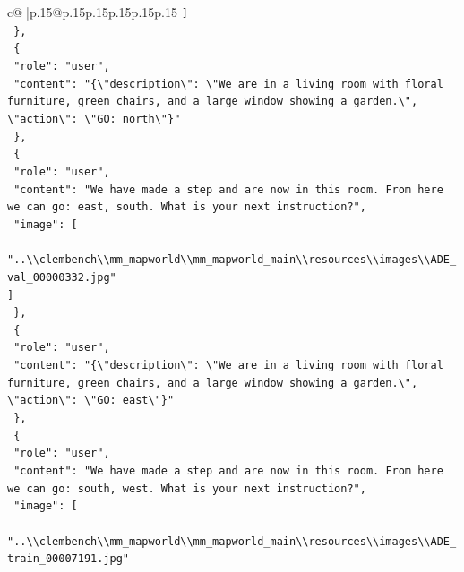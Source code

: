 \documentclass{article}
\begin{document}
{\begin{supertabular}{c@{$\;$}|p{.15\linewidth}@{}p{.15\linewidth}p{.15\linewidth}p{.15\linewidth}p{.15\linewidth}p{.15\linewidth}}
{{{\texttt{    {]}} \\
\texttt{  \},} \\
\texttt{  \{} \\
\texttt{    "role": "user",} \\
\texttt{    "content": "\{\textbackslash{}"description\textbackslash{}": \textbackslash{}"We are in a living room with floral furniture, green chairs, and a large window showing a garden.\textbackslash{}", \textbackslash{}"action\textbackslash{}": \textbackslash{}"GO: north\textbackslash{}"\}"} \\
\texttt{  \},} \\
\texttt{  \{} \\
\texttt{    "role": "user",} \\
\texttt{    "content": "We have made a step and are now in this room. From here we can go: east, south. What is your next instruction?",} \\
\texttt{    "image": {[}} \\
\texttt{      "..\textbackslash{}\textbackslash{}clembench\textbackslash{}\textbackslash{}mm\_mapworld\textbackslash{}\textbackslash{}mm\_mapworld\_main\textbackslash{}\textbackslash{}resources\textbackslash{}\textbackslash{}images\textbackslash{}\textbackslash{}ADE\_val\_00000332.jpg"} \\
\texttt{    {]}} \\
\texttt{  \},} \\
\texttt{  \{} \\
\texttt{    "role": "user",} \\
\texttt{    "content": "\{\textbackslash{}"description\textbackslash{}": \textbackslash{}"We are in a living room with floral furniture, green chairs, and a large window showing a garden.\textbackslash{}", \textbackslash{}"action\textbackslash{}": \textbackslash{}"GO: east\textbackslash{}"\}"} \\
\texttt{  \},} \\
\texttt{  \{} \\
\texttt{    "role": "user",} \\
\texttt{    "content": "We have made a step and are now in this room. From here we can go: south, west. What is your next instruction?",} \\
\texttt{    "image": {[}} \\
\texttt{      "..\textbackslash{}\textbackslash{}clembench\textbackslash{}\textbackslash{}mm\_mapworld\textbackslash{}\textbackslash{}mm\_mapworld\_main\textbackslash{}\textbackslash{}resources\textbackslash{}\textbackslash{}images\textbackslash{}\textbackslash{}ADE\_train\_00007191.jpg"} \\
}}}
\end{supertabular}}
\end{document}
